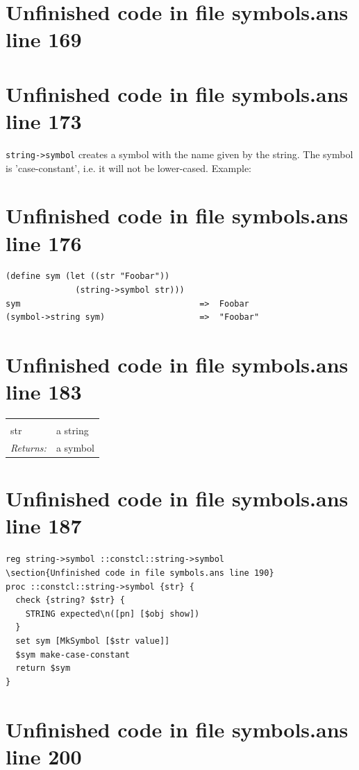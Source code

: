 \documentclass[twoside,9pt]{report}
\begin{document}
\section{Unfinished code in file symbols.ans line 169}

\section{Unfinished code in file symbols.ans line 173}

\texttt{string->symbol} creates a symbol with the name given by the string. The symbol is 'case-constant', i.e. it will not be lower-cased. Example:

\section{Unfinished code in file symbols.ans line 176}
\begin{verbatim}
(define sym (let ((str "Foobar"))
              (string->symbol str)))
sym                                    =>  Foobar
(symbol->string sym)                   =>  "Foobar"
\end{verbatim}
\section{Unfinished code in file symbols.ans line 183}
\noindent\begin{tabular}{ |p{1.9cm} p{8cm}| }
\hline
\rowcolor[HTML]{CCCCCC} \multicolumn{2}{|l|}{\bf string->symbol (public)} \\
str & a string \\
\textit{Returns:} & a symbol \\
\hline
\end{tabular}
\section{Unfinished code in file symbols.ans line 187}
\begin{lstlisting}
reg string->symbol ::constcl::string->symbol
\section{Unfinished code in file symbols.ans line 190}
proc ::constcl::string->symbol {str} {
  check {string? $str} {
    STRING expected\n([pn] [$obj show])
  }
  set sym [MkSymbol [$str value]]
  $sym make-case-constant
  return $sym
}
\end{lstlisting}
\section{Unfinished code in file symbols.ans line 200}
\end{document}
